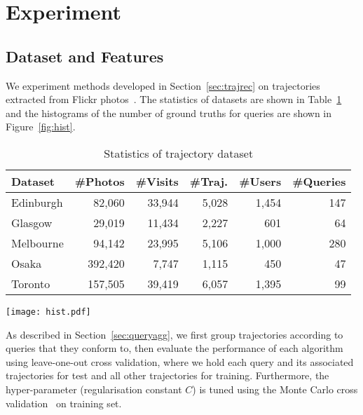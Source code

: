 \section{Experiment}
\label{sec:experiment}

\subsection{Dataset and Features}
\label{sec:dataset}

We experiment methods developed in Section~\ref{sec:trajrec} on trajectories extracted from Flickr photos~\cite{thomee2016yfcc100m}.
The statistics of datasets are shown in Table~\ref{tab:data} and 
the histograms of the number of ground truths for queries are shown in Figure~\ref{fig:hist}.

\begin{table}[t]
\caption{Statistics of trajectory dataset}
\label{tab:data}
\centering
\setlength{\tabcolsep}{4pt} %
\begin{tabular}{l*{5}{r}} \hline
\textbf{Dataset} & \textbf{\#Photos} & \textbf{\#Visits} & \textbf{\#Traj.} & \textbf{\#Users} & \textbf{\#Queries} \\ \hline
Edinburgh & 82,060 & 33,944 & 5,028 & 1,454 & 147 \\
Glasgow & 29,019 & 11,434 & 2,227 & 601 & 64 \\
Melbourne & 94,142 & 23,995 & 5,106 & 1,000 & 280 \\
Osaka & 392,420 & 7,747 & 1,115 & 450 & 47 \\
Toronto & 157,505 & 39,419 & 6,057 & 1,395 & 99 \\
\hline
\end{tabular}
\end{table}


\begin{figure*}[t]
	\centering
	\texttt{[image: hist.pdf]}
	\caption{Histogram of the number of ground truth}
	\label{fig:hist}
\end{figure*}


As described in Section~\ref{sec:queryagg}, 
we first group trajectories according to queries that they conform to,
then evaluate the performance of each algorithm using leave-one-out cross validation,
where we hold each query and its associated trajectories for test and all other trajectories for training.
Furthermore, 
the hyper-parameter (regularisation constant $C$) is tuned using the Monte Carlo cross validation~\cite{burman1989comparative} on training set.

